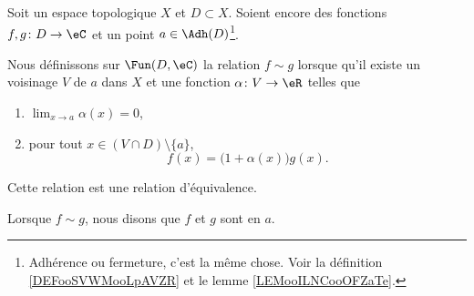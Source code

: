 \begin{propositionDef}       \label{DEFooWDSAooKXZsZY}
	Soit un espace topologique \( X\) et \( D\subset X\). Soient encore des fonctions \( f,g\colon D\to \eC\) et un point \( a\in\Adh(D)\)\footnote{Adhérence ou fermeture, c'est la même chose. Voir la définition \ref{DEFooSVWMooLpAVZR} et le lemme \ref{LEMooILNCooOFZaTe}.}.

	Nous définissons sur \( \Fun(D,\eC)\) la relation \( f\sim g\) lorsque qu'il existe un voisinage \( V\) de \( a\) dans \( X\) et une fonction \( \alpha\colon V\to \eR\) telles que
	\begin{enumerate}
		\item
		      \( \lim_{x\to a} \alpha(x)=0\),
		\item
		      pour tout \( x\in (V\cap D)\setminus\{ a \}\),
		      \begin{equation}        \label{EQooQXKYooSDPpNq}
			      f(x)=\big( 1+\alpha(x) \big)g(x).
		      \end{equation}
	\end{enumerate}
	Cette relation est une relation d'équivalence.

	Lorsque \( f\sim g\), nous disons que \( f\) et \( g\) sont  en \( a\).
\end{propositionDef}


